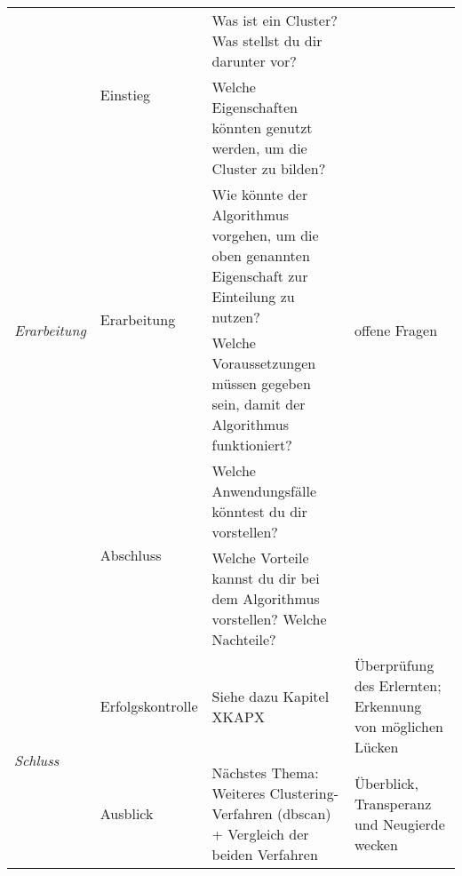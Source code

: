 \begin{longtable}[c]{@{}lp{3.5cm}p{4.5cm}p{4.0cm}@{}}
	\multirow{6}{*}{\textit{Erarbeitung}} & \multirow{2}{*}{Einstieg}     & Was ist ein Cluster? Was stellst du dir darunter vor?                                                                                                     & \multirow{6}{*}{offene Fragen}                                    \\* \cmidrule(lr){3-3}
	&                                              & Welche Eigenschaften könnten genutzt werden, um die Cluster zu bilden?                                                                                    &                                                                   \\* \cmidrule(lr){2-3}
	& \multirow{2}{*}{Erarbeitung} & Wie könnte der Algorithmus vorgehen, um die oben genannten Eigenschaft zur Einteilung zu nutzen?                                                          &                                                                   \\* \cmidrule(lr){3-3}
	&                                              & Welche Voraussetzungen müssen gegeben sein, damit der Algorithmus funktioniert?                                                                           &                                                                   \\* \cmidrule(lr){2-3}
	& \multirow{2}{*}{Abschluss}                   & Welche Anwendungsfälle könntest du dir vorstellen?                                                                                                        &                                                                   \\* \cmidrule(lr){3-3}
	&                                              & Welche Vorteile kannst du dir bei dem Algorithmus vorstellen? Welche Nachteile?                                                                           &                                                                   \\* \midrule
	\multirow{4}{*}{\textit{Schluss}}     & Erfolgskontrolle                             & Siehe dazu Kapitel XKAPX                                                                                                                                  & Überprüfung des Erlernten; Erkennung von möglichen Lücken         \\* \cmidrule(l){2-4} 
	& Ausblick                                     & Nächstes Thema: Weiteres Clustering-Verfahren (dbscan) + Vergleich der beiden Verfahren                                                                   & Überblick, Transperanz und Neugierde wecken                       \\* \cmidrule(l){2-4} 

\end{longtable}
